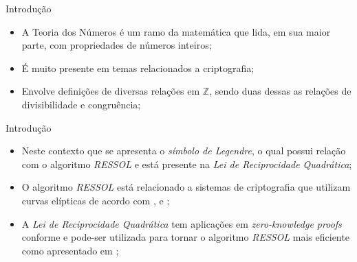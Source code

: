 \begin{frame}{Introdução}
    \begin{itemize}
        \item A Teoria dos Números é um ramo da matemática que lida, em sua maior parte, com  propriedades de números inteiros;
        \item É muito presente em temas relacionados a criptografia;
        \item Envolve definições de diversas relações em $\mathbb{Z}$, sendo duas dessas as relações de divisibilidade e congruência;
    \end{itemize}
\end{frame}

\begin{frame}{Introdução}
    \begin{itemize}
        \item Neste contexto que se apresenta o \textit{símbolo de Legendre}, o qual possui relação com o algoritmo \textit{RESSOL} e está presente na \textit{Lei de Reciprocidade Quadrática};
        \item O algoritmo \textit{RESSOL} está relacionado a sistemas de criptografia que utilizam curvas elípticas de acordo com \cite{PalashSarkar2024AdvancesinMathematicsofCommunications}, \cite{kumar2021algorithm} e \cite{7133812};
        
        \item A \textit{Lei de Reciprocidade Quadrática} tem aplicações em \textit{zero-knowledge proofs} conforme \cite{Wright2016} e pode-ser utilizada para tornar o algoritmo \textit{RESSOL} mais eficiente como apresentado em \cite{johndcookQuadraticReciprocity};

    \end{itemize}
\end{frame}


